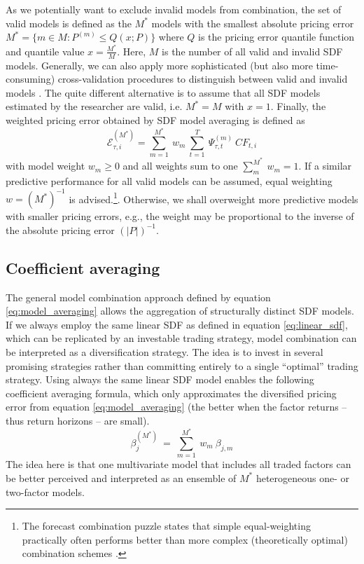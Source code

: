 \documentclass[12pt]{article}
\begin{document}
As we potentially want to exclude invalid models from combination, the set of valid models is defined as the $M^*$ models with the smallest absolute pricing error $M^*=\{m \in M: P^{(m)} \leq Q(x;P) \}$ where $Q$ is the pricing error quantile function and quantile value $x = \frac{M^*}{M}$.
Here, $M$ is the number of all valid and invalid SDF models.
Generally, we can also apply more sophisticated (but also more time-consuming) cross-validation procedures to distinguish between valid and invalid models \citep{AC10}.
The quite different alternative is to assume that all SDF models estimated by the researcher are valid, i.e. $M^*=M$ with $x=1$.
Finally, the weighted pricing error obtained by SDF model averaging is defined as
\begin{equation}
\label{eq:model_averaging}
\mathcal{E}_{\tau, i}^{(M^*)} = 
\sum_{m=1}^{M^*} \  
w_m \
\sum_{t=1}^{T} \
\Psi_{\tau,t}^{(m)}\ 
{CF}_{t, i}
\end{equation}
with model weight $w_m \geq 0$ and all weights sum to one $\sum_m^{M^*}\ w_m=1$. 
If a similar predictive performance for all valid models can be assumed, equal weighting $w=(M^*)^{-1}$ is advised.\footnote{The forecast combination puzzle states that simple equal-weighting practically often performs better than more complex (theoretically optimal) combination schemes \citep{SW09,CMVW16,QRCY19}.}.
Otherwise, we shall overweight more predictive models with smaller pricing errors, e.g., the weight may be proportional to the inverse of the absolute pricing error $\left(\left|P\right|\right)^{-1}$.

\subsection{Coefficient averaging}
\label{sec:coef_averaging}

The general model combination approach defined by equation \ref{eq:model_averaging} allows the aggregation of structurally distinct SDF models.
If we always employ the same linear SDF as defined in equation \ref{eq:linear_sdf}, which can be replicated by an investable trading strategy, model combination can be interpreted as a diversification strategy.
The idea is to invest in several promising strategies rather than committing entirely to a single ``optimal'' trading strategy.
Using always the same linear SDF model enables the following coefficient averaging formula, which only approximates the diversified pricing error from equation \ref{eq:model_averaging} (the better when the factor returns -- thus return horizons -- are small).
\begin{equation}
\label{eq:coef_averaging}
\beta_j^{(M^*)}\ =\ \sum_{m=1}^{M^*}\ w_m \ \beta_{j,m}
\end{equation}
The idea here is that one multivariate model that includes all traded factors can be better perceived and interpreted as an ensemble of $M^*$ heterogeneous one- or two-factor models.
\end{document}
